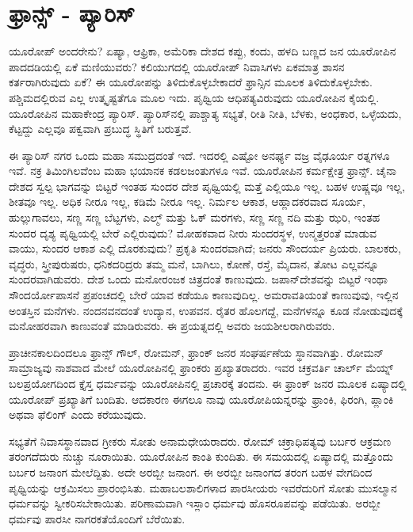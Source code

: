 \newpage

\section*{ಫ್ರಾನ್ಸ್ - ಪ್ಯಾರಿಸ್}

\vskip 8pt

\vskip 5pt

\vskip 5pt

ಯೂರೋಪ್​ ಅಂದರೇನು? ಏಷ್ಯಾ, ಆಫ್ರಿಕಾ, ಅಮೆರಿಕಾ ದೇಶದ ಕಪ್ಪು, ಕಂದು, ಹಳದಿ ಬಣ್ಣದ ಜನ ಯೂರೋಪಿನ ಪಾದದಡಿಯಲ್ಲಿ ಏಕೆ ಮಣಿಯುವರು? ಕಲಿಯುಗದಲ್ಲಿ ಯೂರೋಪ್​ ನಿವಾಸಿಗಳು ಏಕಮಾತ್ರ ಶಾಸನ ಕರ್ತರಾಗಿರುವುದು ಏಕೆ? ಈ ಯೂರೋಪನ್ನು ತಿಳಿದುಕೊಳ್ಳಬೇಕಾದರೆ ಫ್ರಾನ್ಸಿನ ಮೂಲಕ ತಿಳಿದುಕೊಳ್ಳಬೇಕು. ಪಶ್ಚಿಮದಲ್ಲಿರುವ ಎಲ್ಲ ಉತ್ಕೃಷ್ಟತೆಗೂ ಮೂಲ ಇದು. ಪೃಥ್ವಿಯ ಆಧಿಪತ್ಯವಿರುವುದು ಯೂರೋಪಿನ ಕೈಯಲ್ಲಿ. ಯೂರೋಪಿನ ಮಹಾಕೇಂದ್ರ ಪ್ಯಾರಿಸ್​. ಪ್ಯಾರಿಸ್​ನಲ್ಲಿ ಪಾಶ್ಚಾತ್ಯ ಸಭ್ಯತೆ, ರೀತಿ ನೀತಿ, ಬೆಳಕು, ಅಂಧಕಾರ, ಒಳ್ಳೆಯದು, ಕೆಟ್ಟದ್ದು ಎಲ್ಲವೂ ಪಕ್ವವಾಗಿ ಪ್ರಬುದ್ಧ ಸ್ಥಿತಿಗೆ ಬರುತ್ತವೆ.

\vskip 5pt

ಈ ಪ್ಯಾರಿಸ್​ ನಗರ ಒಂದು ಮಹಾ ಸಮುದ್ರದಂತೆ ಇದೆ. ಇದರಲ್ಲಿ ಎಷ್ಟೋ ಅನರ್ಘ್ಯ ವಜ್ರ ವೈಢೂರ್ಯ ರತ್ನಗಳೂ ಇವೆ. ನಕ್ರ ತಿಮಿಂಗಿಲವೆಂಬ ಮಹಾ ಭಯಾನಕ ಕಡಲಜಂತುಗಳೂ ಇವೆ. ಯೂರೋಪಿನ ಕರ್ಮಕ್ಷೇತ್ರ ಫ್ರಾನ್ಸ್​. ಚೈನಾ ದೇಶದ ಸ್ವಲ್ಪ ಭಾಗವನ್ನು ಬಿಟ್ಟರೆ ಇಂತಹ ಸುಂದರ ದೇಶ ಪೃಥ್ವಿಯಲ್ಲಿ ಮತ್ತೆ ಎಲ್ಲಿಯೂ ಇಲ್ಲ. ಬಹಳ ಉಷ್ಣವೂ ಇಲ್ಲ, ಶೀತವೂ ಇಲ್ಲ. ಅಧಿಕ ನೀರೂ ಇಲ್ಲ, ಕಡಿಮೆ ನೀರೂ ಇಲ್ಲ. ನಿರ್ಮಲ ಆಕಾಶ, ಆಹ್ಲಾದಕರವಾದ ಸೂರ್ಯ, ಹುಲ್ಲುಗಾವಲು, ಸಣ್ಣ ಸಣ್ಣ ಬೆಟ್ಟಗಳು, ಎಲ್ಮ್​ ಮತ್ತು ಓಕ್​ ಮರಗಳು, ಸಣ್ಣ ಸಣ್ಣ ನದಿ ಮತ್ತು ಝರಿ, ಇಂತಹ ಸುಂದರ ದೃಶ್ಯ ಪೃಥ್ವಿಯಲ್ಲಿ ಬೇರೆ ಎಲ್ಲಿರುವುದು? ಮೋಹಕವಾದ ನೀರು ಸುಂದರಸ್ಥಳ, ಉನ್ಮತ್ತರಂತೆ ಮಾಡುವ ವಾಯು, ಸುಂದರ ಆಕಾಶ ಎಲ್ಲಿ ದೊರಕುವುದು? ಪ್ರಕೃತಿ ಸುಂದರವಾಗಿದೆ; ಜನರು ಸೌಂದರ್ಯ ಪ್ರಿಯರು. ಬಾಲಕರು, ವೃದ್ಧರು, ಸ್ತ್ರೀಪುರುಷರು, ಧನಿಕದರಿದ್ರರು ತಮ್ಮ ಮನೆ, ಬಾಗಿಲು, ಕೋಣೆ, ರಸ್ತೆ, ಮೈದಾನ, ತೋಟ ಎಲ್ಲವನ್ನೂ ಸುಂದರವಾಗಿಡುವರು. ದೇಶ ಒಂದು ಮನೋರಂಜಕ ಚಿತ್ರದಂತೆ ಕಾಣುವುದು. ಜಪಾನ್​ ದೇಶವನ್ನು ಬಿಟ್ಟರೆ ಇಂಥಾ ಸೌಂದರ್ಯೋಪಾಸನೆ ಪ್ರಪಂಚದಲ್ಲಿ ಬೇರೆ ಯಾವ ಕಡೆಯೂ ಕಾಣುವುದಿಲ್ಲ. ಅಮರಾವತಿಯಂತೆ ಕಾಣುವುವು, ಇಲ್ಲಿನ ಅಂತಸ್ತಿನ ಮನೆಗಳು. ನಂದನವನದಂತೆ ಉದ್ಯಾನ, ಉಪವನ. ರೈತರ ಹೊಲಗದ್ದೆ, ಮನೆಗಳನ್ನೂ ಕೂಡ ನೋಡುವುದಕ್ಕೆ ಮನೋಹರವಾಗಿ ಕಾಣುವಂತೆ ಮಾಡಿರುವರು. ಈ ಪ್ರಯತ್ನದಲ್ಲಿ ಅವರು ಜಯಶೀಲರಾಗಿರುವರು.

\vskip 5pt

ಪ್ರಾಚೀನಕಾಲದಿಂದಲೂ ಫ್ರಾನ್ಸ್​ ಗೌಲ್​, ರೋಮನ್​, ಫ್ರಾಂಕ್​ ಜನರ ಸಂಘರ್ಷಣೆಯ ಸ್ಥಾನವಾಗಿತ್ತು. ರೋಮನ್​ ಸಾಮ್ರಾಜ್ಯವು ನಾಶವಾದ ಮೇಲೆ ಯೂರೋಪಿನಲ್ಲಿ ಫ್ರಾಂಕರು ಪ್ರಖ್ಯಾತರಾದರು. ಇವರ ಚಕ್ರವರ್ತಿ ಚಾರ್ಲ್​ ಮೆಯ್ನ್​ ಬಲಪ್ರಯೋಗದಿಂದ ಕ್ತೈಸ್ತ ಧರ್ಮವನ್ನು ಯೂರೋಪಿನಲ್ಲಿ ಪ್ರಚಾರಕ್ಕೆ ತಂದನು. ಈ ಫ್ರಾಂಕ್​ ಜನರ ಮೂಲಕ ಏಷ್ಯಾದಲ್ಲಿ ಯೂರೋಪ್​ ಪ್ರಖ್ಯಾತಿಗೆ ಬಂದಿತು. ಆದಕಾರಣ ಈಗಲೂ ನಾವು ಯೂರೋಪಿಯನ್ನರನ್ನು ಫ್ರಾಂಕಿ, ಫಿರಂಗಿ, ಪ್ಲಾಂಕಿ ಅಥವಾ ಫೆಲಿಂಗ್​ ಎಂದು ಕರೆಯುವುದು.

\vskip 5pt

ಸಭ್ಯತೆಗೆ ನಿವಾಸಸ್ಥಾನವಾದ ಗ್ರೀಕರು ಸೋತು ಅನಾಮಧೇಯರಾದರು. ರೋಮ್​ ಚಕ್ರಾಧಿಪತ್ಯವು ಬರ್ಬರ ಆಕ್ರಮಣ ತರಂಗದೆದುರು ನುಚ್ಚು ನೂರಾಯಿತು. ಯೂರೋಪಿನ ಕಾಂತಿ ಕುಂದಿತು. ಈ ಸಮಯದಲ್ಲಿ ಏಷ್ಯಾದಲ್ಲಿ ಮತ್ತೊಂದು ಬರ್ಬರ ಜನಾಂಗ ಮೇಲೆದ್ದಿತು. ಅದೇ ಅರಬ್ಬೀ ಜನಾಂಗ. ಈ ಅರಬ್ಬೀ ಜನಾಂಗದ ತರಂಗ ಬಹಳ ವೇಗದಿಂದ ಪೃಥ್ವಿಯನ್ನು ಆಕ್ರಮಿಸಲು ಪ್ರಾರಂಭಿಸಿತು. ಮಹಾಬಲಶಾಲಿಗಳಾದ ಪಾರಸೀಯರು ಇವರೆದುರಿಗೆ ಸೋತು ಮುಸಲ್ಮಾನ ಧರ್ಮವನ್ನು ಸ್ವೀಕರಿಸಬೇಕಾಯಿತು. ಪರಿಣಾಮವಾಗಿ ಇಸ್ಲಾಂ ಧರ್ಮವು ಹೊಸರೂಪವನ್ನು ಪಡೆಯಿತು. ಅರಬ್ಬೀ ಧರ್ಮವು ಪಾರಸೀ ನಾಗರಕತೆಯೊಂದಿಗೆ ಬೆರೆಯಿತು.

